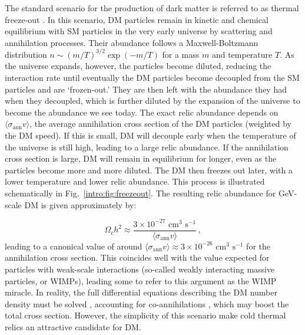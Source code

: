 The standard scenario for the production of dark matter is referred to as thermal freeze-out \cite{Kolb:1990}. In this scenario, DM particles remain in kinetic and chemical equilibrium with SM particles in the very early universe by scattering and annihilation processes. Their abundance follows a Maxwell-Boltzmann distribution $n \sim (m/T)^{3/2} \exp(-m/T)$ for a mass $m$ and temperature $T$. As the universe expands, however, the particles become diluted, reducing the interaction rate  until eventually the DM particles become decoupled from the SM particles and are `frozen-out.' They are then left with the abundance they had when they decoupled, which is further diluted by the expansion of the universe to become the abundance we see today. The exact relic abundance depends on $\langle \sigma_\mathrm{ann} v\rangle$, the average annihilation cross section of the DM particles (weighted by the DM speed). If this is small, DM will decouple early when the temperature of the universe is still high, leading to a large relic abundance. If the annihilation cross section is large, DM will remain in equilibrium  for longer, even as the particles become more and more diluted. The DM then freezes out later, with a lower temperature and lower relic abundance. This process is illustrated schematically in Fig.~\ref{intro:fig:freezeout}.  The resulting relic abundance for GeV-scale DM is given approximately by:

\begin{equation}
\Omega_c h^2 \approx \frac{3 \times 10^{-27} \textrm{ cm}^{3} \textrm{ s}^{-1}}{\langle \sigma_\mathrm{ann} v \rangle}\,,
\end{equation}
leading to a canonical value of around $\langle \sigma_\mathrm{ann} v \rangle \approx 3 \times 10^{-26} \textrm{ cm}^{3} \textrm{ s}^{-1}$ for the annihilation cross section. This coincides well with the value expected for particles with weak-scale interactions (so-called weakly interacting massive particles, or WIMPs), leading some to refer to this argument as the WIMP miracle.  In reality, the full differential equations describing the DM number density must be solved \cite{Gelmini:2010}, accounting for co-annihilations \cite{Griest:1991}, which may boost the total cross section. However, the simplicity of this scenario make cold thermal relics an attractive candidate for DM.

